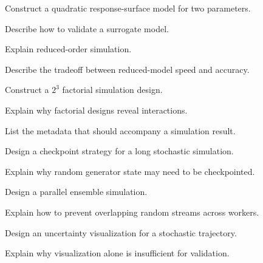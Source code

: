 \begin{exercise}[3]
Construct a quadratic response-surface model for two parameters.
\end{exercise}

\begin{exercise}[3]
Describe how to validate a surrogate model.
\end{exercise}

\begin{exercise}[3]
Explain reduced-order simulation.
\end{exercise}

\begin{exercise}[3]
Describe the tradeoff between reduced-model speed and accuracy.
\end{exercise}

\begin{exercise}[3]
Construct a \(2^3\) factorial simulation design.
\end{exercise}

\begin{exercise}[3]
Explain why factorial designs reveal interactions.
\end{exercise}

\begin{exercise}[3]
List the metadata that should accompany a simulation result.
\end{exercise}

\begin{exercise}[3]
Design a checkpoint strategy for a long stochastic simulation.
\end{exercise}

\begin{exercise}[3]
Explain why random generator state may need to be checkpointed.
\end{exercise}

\begin{exercise}[3]
Design a parallel ensemble simulation.
\end{exercise}

\begin{exercise}[3]
Explain how to prevent overlapping random streams across workers.
\end{exercise}

\begin{exercise}[3]
Design an uncertainty visualization for a stochastic trajectory.
\end{exercise}

\begin{exercise}[3]
Explain why visualization alone is insufficient for validation.
\end{exercise}

